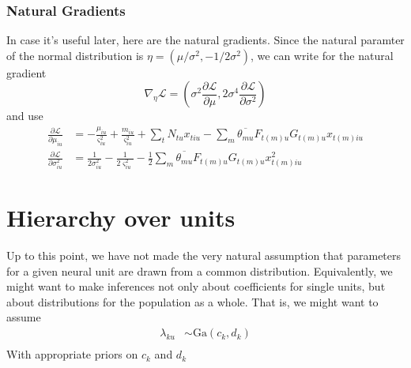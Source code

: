 \documentclass[11pt]{article}
\begin{document}
\subsubsection{Natural Gradients}
In case it's useful later, here are the natural gradients. Since the natural paramter of the normal distribution is $\eta = (\mu/\sigma^2, -1/2\sigma^2)$, we can write for the natural gradient
\begin{equation}
    \nabla_\eta \mathcal{L} = \left( \sigma^2 \frac{\partial \mathcal{L}}{\partial \mu}, 2\sigma^4 \frac{\partial \mathcal{L}}{\partial \sigma^2}\right)
\end{equation}
and use
\begin{align}
    \frac{\partial \mathcal{L}}{\partial \mu_{iu}} &=
    -\frac{\mu_{iu}}{\varsigma^2_{iu}} + \frac{m_{iu}}{\varsigma^2_{iu}} + \sum_t N_{tu} x_{tiu} - \sum_{m} \overline{\theta_{mu}} F_{t(m)u} G_{t(m)u} x_{t(m)iu} \\
    \frac{\partial \mathcal{L}}{\partial \sigma^2_{iu}} &=
    \frac{1}{2\sigma^2_{iu}} - \frac{1}{2\varsigma^2_{iu}} - \frac{1}{2} \sum_{m} \overline{\theta_{mu}} F_{t(m)u} G_{t(m)u} x^2_{t(m)iu}
\end{align}

\section{Hierarchy over units}
Up to this point, we have not made the very natural assumption that parameters for a given neural unit are drawn from a common distribution. Equivalently, we might want to make inferences not only about coefficients for single units, but about distributions for the population as a whole. That is, we might want to assume
\begin{align}
    \lambda_{ku} &\sim \mathrm{Ga}(c_k, d_k) \\
\end{align}
With appropriate priors on $c_k$ and $d_k$
\end{document}
